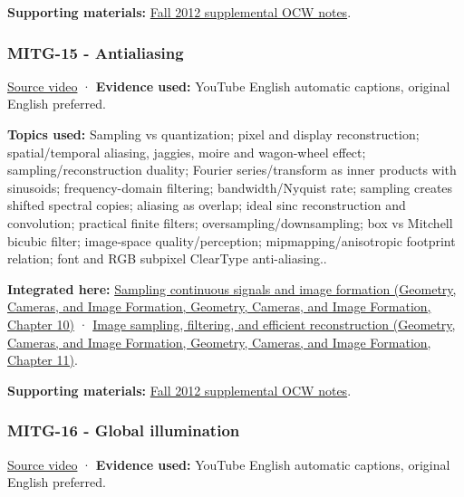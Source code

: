 \textbf{Supporting materials:} \href{https://ocw.mit.edu/courses/6-837-computer-graphics-fall-2012/pages/lecture-notes/}{Fall 2012 supplemental OCW notes}.

\subsubsection{MITG-15 - Antialiasing}\label{04-visual-computing-ii-ch036-mitg-15---antialiasing}

\href{https://www.youtube.com/watch?v=eHXDosme1eo}{Source video} · \textbf{Evidence used:} YouTube English automatic captions, original English preferred.

\textbf{Topics used:} Sampling vs quantization; pixel and display reconstruction; spatial/temporal aliasing, jaggies, moire and wagon-wheel effect; sampling/reconstruction duality; Fourier series/transform as inner products with sinusoids; frequency-domain filtering; bandwidth/Nyquist rate; sampling creates shifted spectral copies; aliasing as overlap; ideal sinc reconstruction and convolution; practical finite filters; oversampling/downsampling; box vs Mitchell bicubic filter; image-space quality/perception; mipmapping/anisotropic footprint relation; font and RGB subpixel ClearType anti-aliasing..

\textbf{Integrated here:} \href{../03-Geometry-Cameras-and-Image-Formation/main.pdf\#nameddest=03-visual-computing-i-ch003-sampling-continuous-signals-and-image-formation}{Sampling continuous signals and image formation (Geometry, Cameras, and Image Formation, Geometry, Cameras, and Image Formation, Chapter 10)} · \href{../03-Geometry-Cameras-and-Image-Formation/main.pdf\#nameddest=03-visual-computing-i-ch004-image-sampling-filtering-and-efficient-reconstruction}{Image sampling, filtering, and efficient reconstruction (Geometry, Cameras, and Image Formation, Geometry, Cameras, and Image Formation, Chapter 11)}.

\textbf{Supporting materials:} \href{https://ocw.mit.edu/courses/6-837-computer-graphics-fall-2012/pages/lecture-notes/}{Fall 2012 supplemental OCW notes}.

\subsubsection{MITG-16 - Global illumination}\label{04-visual-computing-ii-ch036-mitg-16---global-illumination}

\href{https://www.youtube.com/watch?v=xjBwPxU7tUk}{Source video} · \textbf{Evidence used:} YouTube English automatic captions, original English preferred.

